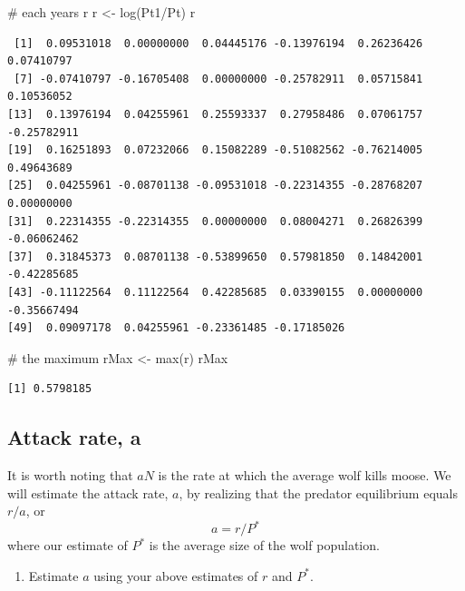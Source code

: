 \documentclass[
  letterpaper,
  DIV=11,
  numbers=noendperiod]{scrreprt}
\newenvironment{Shaded}{\begin{snugshade}}{\end{snugshade}}
\newcommand{\CommentTok}[1]{\textcolor[rgb]{0.37,0.37,0.37}{#1}}
\newcommand{\FunctionTok}[1]{\textcolor[rgb]{0.28,0.35,0.67}{#1}}
\newcommand{\NormalTok}[1]{\textcolor[rgb]{0.00,0.23,0.31}{#1}}
\newcommand{\OtherTok}[1]{\textcolor[rgb]{0.00,0.23,0.31}{#1}}
\newcommand{\SpecialCharTok}[1]{\textcolor[rgb]{0.37,0.37,0.37}{#1}}
\providecommand{\tightlist}{%
  \setlength{\itemsep}{0pt}\setlength{\parskip}{0pt}}
\begin{document}
\begin{Shaded}
\begin{Highlighting}[]
\CommentTok{\# each year\textquotesingle{}s r}
\NormalTok{r }\OtherTok{\textless{}{-}} \FunctionTok{log}\NormalTok{(Pt1}\SpecialCharTok{/}\NormalTok{Pt)}
\NormalTok{r}
\end{Highlighting}
\end{Shaded}

\begin{verbatim}
 [1]  0.09531018  0.00000000  0.04445176 -0.13976194  0.26236426  0.07410797
 [7] -0.07410797 -0.16705408  0.00000000 -0.25782911  0.05715841  0.10536052
[13]  0.13976194  0.04255961  0.25593337  0.27958486  0.07061757 -0.25782911
[19]  0.16251893  0.07232066  0.15082289 -0.51082562 -0.76214005  0.49643689
[25]  0.04255961 -0.08701138 -0.09531018 -0.22314355 -0.28768207  0.00000000
[31]  0.22314355 -0.22314355  0.00000000  0.08004271  0.26826399 -0.06062462
[37]  0.31845373  0.08701138 -0.53899650  0.57981850  0.14842001 -0.42285685
[43] -0.11122564  0.11122564  0.42285685  0.03390155  0.00000000 -0.35667494
[49]  0.09097178  0.04255961 -0.23361485 -0.17185026
\end{verbatim}

\begin{Shaded}
\begin{Highlighting}[]
\CommentTok{\# the maximum}
\NormalTok{rMax }\OtherTok{\textless{}{-}} \FunctionTok{max}\NormalTok{(r)}
\NormalTok{rMax}
\end{Highlighting}
\end{Shaded}

\begin{verbatim}
[1] 0.5798185
\end{verbatim}

\subsection{Attack rate, a}\label{attack-rate-a}

It is worth noting that \(aN\) is the rate at which the average wolf
kills moose. We will estimate the attack rate, \(a\), by realizing that
the predator equilibrium equals \(r/a\), or \[a = r/P^*\] where our
estimate of \(P^*\) is the average size of the wolf population.

\begin{enumerate}
\def\labelenumi{\arabic{enumi}.}
\setcounter{enumi}{6}
\tightlist
\item
  Estimate \(a\) using your above estimates of \(r\) and \(P^*\).
\end{enumerate}
\end{document}
